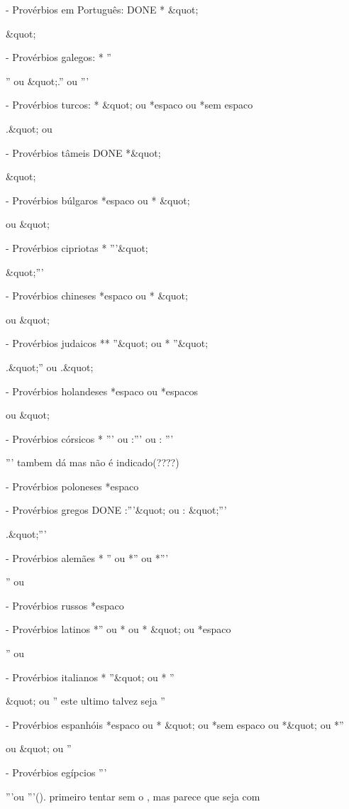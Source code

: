 - Provérbios em Português:    DONE
* &quot;

&quot;

- Provérbios galegos:
* ''

'' ou &quot;.'' ou '''

- Provérbios turcos:
* &quot; ou *{espaco} ou *{sem espaco}

.&quot; ou \n

- Provérbios tâmeis   DONE
*&quot;

&quot;

- Provérbios búlgaros
*{espaco} ou * &quot;

\n ou &quot;

- Provérbios cipriotas
* '''&quot;

&quot;'''

- Provérbios chineses
*{espaco} ou * &quot;

\n ou &quot;

- Provérbios judaicos
** ''&quot; ou * ''&quot;

.&quot;'' ou .&quot;

- Provérbios holandeses
*{espaco} ou *{espacos}

\n ou &quot;

- Provérbios córsicos
* ''' ou :''' ou : '''

'''                  \n tambem dá mas não é indicado(????)

- Provérbios poloneses
*{espaco}

\n

- Provérbios gregos     DONE
:'''&quot; ou : &quot;'''

.&quot;'''

- Provérbios alemães
* '' ou *'' ou *'''

'' ou \n

- Provérbios russos
*{espaco}

\n

- Provérbios latinos
*'' ou * ou * &quot; ou *{espaco}

'' ou \n

- Provérbios italianos
* ''&quot; ou * ''

&quot; ou ''                este ultimo talvez seja ''\n

- Provérbios espanhóis
*{espaco} ou * &quot; ou *{sem espaco} ou *&quot; ou *''

\n ou &quot; ou ''\n

- Provérbios egípcios
'''

'''\n ou '''().               primeiro tentar sem o \n, mas parece que seja com \n

